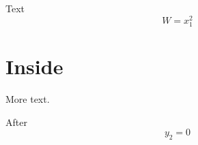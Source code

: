 \documentclass{article}
\begin{document}
\begin{linenumbers*}
Text
$$
W = x_1^2
$$
\section{Inside}
More text.
\end{linenumbers*}
\begin{runninglinenumbers*}[1]
After $$y_2 = 0$$
\end{runninglinenumbers*}
\end{document}

